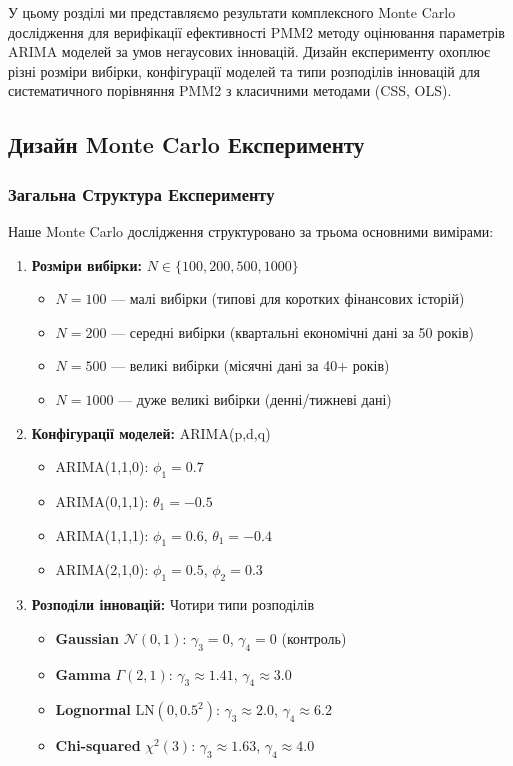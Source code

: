 \documentclass[12pt,a4paper]{article}
\begin{document}
У цьому розділі ми представляємо результати комплексного Monte Carlo дослідження для верифікації ефективності PMM2 методу оцінювання параметрів ARIMA моделей за умов негаусових інновацій. Дизайн експерименту охоплює різні розміри вибірки, конфігурації моделей та типи розподілів інновацій для систематичного порівняння PMM2 з класичними методами (CSS, OLS).

\subsection{Дизайн Monte Carlo Експерименту}
\label{subsec:experiment_design}

\subsubsection{Загальна Структура Експерименту}

Наше Monte Carlo дослідження структуровано за трьома основними вимірами:

\begin{enumerate}
    \item \textbf{Розміри вибірки:} $N \in \{100, 200, 500, 1000\}$
    \begin{itemize}
        \item $N = 100$ --- малі вибірки (типові для коротких фінансових історій)
        \item $N = 200$ --- середні вибірки (квартальні економічні дані за 50 років)
        \item $N = 500$ --- великі вибірки (місячні дані за 40+ років)
        \item $N = 1000$ --- дуже великі вибірки (денні/тижневі дані)
    \end{itemize}

    \item \textbf{Конфігурації моделей:} ARIMA(p,d,q)
    \begin{itemize}
        \item ARIMA(1,1,0): $\phi_1 = 0.7$
        \item ARIMA(0,1,1): $\theta_1 = -0.5$
        \item ARIMA(1,1,1): $\phi_1 = 0.6$, $\theta_1 = -0.4$
        \item ARIMA(2,1,0): $\phi_1 = 0.5$, $\phi_2 = 0.3$
    \end{itemize}

    \item \textbf{Розподіли інновацій:} Чотири типи розподілів
    \begin{itemize}
        \item \textbf{Gaussian} $\mathcal{N}(0,1)$: $\gamma_3 = 0$, $\gamma_4 = 0$ (контроль)
        \item \textbf{Gamma} $\Gamma(2,1)$: $\gamma_3 \approx 1.41$, $\gamma_4 \approx 3.0$
        \item \textbf{Lognormal} $\text{LN}(0, 0.5^2)$: $\gamma_3 \approx 2.0$, $\gamma_4 \approx 6.2$
        \item \textbf{Chi-squared} $\chi^2(3)$: $\gamma_3 \approx 1.63$, $\gamma_4 \approx 4.0$
    \end{itemize}
\end{enumerate}
\end{document}
